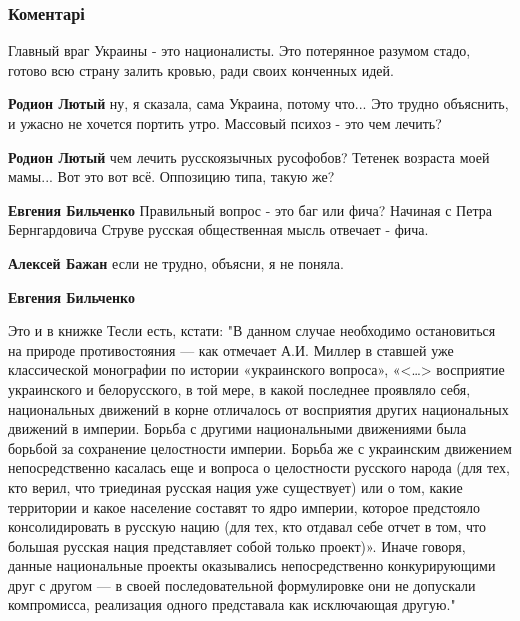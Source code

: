  
 
 
 
 
\subsubsection{Коментарі}

\begin{itemize} %
Главный враг Украины - это националисты. Это потерянное разумом стадо, готово всю страну залить кровью, ради своих конченных идей.

\begin{itemize} %
\textbf{Родион Лютый} ну, я сказала, сама Украина, потому что... Это трудно объяснить, и ужасно не хочется портить утро. Массовый психоз - это чем лечить?

\textbf{Родион Лютый} чем лечить русскоязычных русофобов? Тетенек возраста моей мамы... Вот это вот всё. Оппозицию типа, такую же?

\textbf{Евгения Бильченко} Правильный вопрос - это баг или фича? Начиная с Петра Бернгардовича Струве русская общественная мысль отвечает - фича.

\textbf{Алексей Бажан} если не трудно, объясни, я не поняла.

\textbf{Евгения Бильченко} 

Это и в книжке Тесли есть, кстати: "В данном случае необходимо остановиться на
природе противостояния — как отмечает А.И. Миллер в ставшей уже классической
монографии по истории «украинского вопроса», «<…> восприятие украинского и
белорусского, в той мере, в какой последнее проявляло себя, национальных
движений в корне отличалось от восприятия других национальных движений в
империи. Борьба с другими национальными движениями была борьбой за сохранение
целостности империи. Борьба же с украинским движением непосредственно касалась
еще и вопроса о целостности русского народа (для тех, кто верил, что триединая
русская нация уже существует) или о том, какие территории и какое население
составят то ядро империи, которое предстояло консолидировать в русскую нацию
(для тех, кто отдавал себе отчет в том, что большая русская нация представляет
собой только проект)». Иначе говоря, данные национальные проекты оказывались
непосредственно конкурирующими друг с другом — в своей последовательной
формулировке они не допускали компромисса, реализация одного представала как
исключающая другую."


\end{itemize}
\end{itemize}
